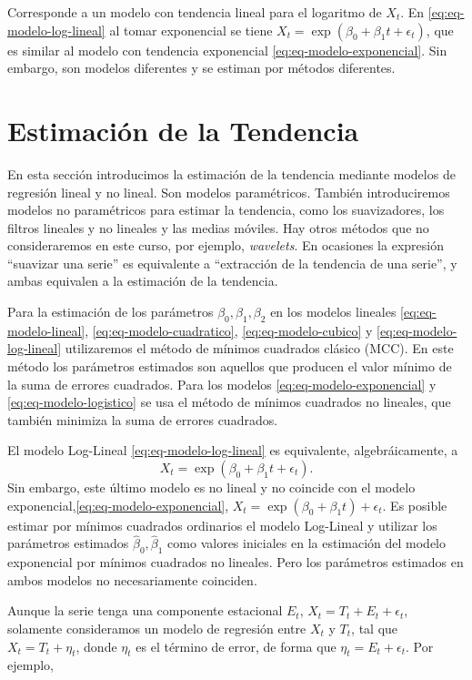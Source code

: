 \documentclass[12pt,]{krantz}
\theoremstyle{definition}
\theoremstyle{definition}
\theoremstyle{definition}
\theoremstyle{remark}
\begin{document}
Corresponde a un modelo con tendencia lineal para el logaritmo de
\(X_t\). En \eqref{eq:eq-modelo-log-lineal} al tomar exponencial se tiene
\(X_t = \exp(\beta_0+\beta_1t + \epsilon_t)\), que es similar al modelo
con tendencia exponencial \eqref{eq:eq-modelo-exponencial}. Sin embargo,
son modelos diferentes y se estiman por métodos diferentes.

\section{Estimación de la Tendencia}\label{estimacion-de-la-tendencia}

En esta sección introducimos la estimación de la tendencia mediante
modelos de regresión lineal y no lineal. Son modelos paramétricos.
También introduciremos modelos no paramétricos para estimar la
tendencia, como los suavizadores, los filtros lineales y no lineales y
las medias móviles. Hay otros métodos que no consideraremos en este
curso, por ejemplo, \emph{wavelets}. En ocasiones la expresión
``suavizar una serie'' es equivalente a ``extracción de la tendencia de
una serie'', y ambas equivalen a la estimación de la tendencia.

Para la estimación de los parámetros \(\beta_0,\beta_1,\beta_2\) en los
modelos lineales \eqref{eq:eq-modelo-lineal},
\eqref{eq:eq-modelo-cuadratico}, \eqref{eq:eq-modelo-cubico} y
\eqref{eq:eq-modelo-log-lineal} utilizaremos el método de mínimos
cuadrados clásico (MCC). En este método los parámetros estimados son
aquellos que producen el valor mínimo de la suma de errores cuadrados.
Para los modelos \eqref{eq:eq-modelo-exponencial} y
\eqref{eq:eq-modelo-logistico} se usa el método de mínimos cuadrados no
lineales, que también minimiza la suma de errores cuadrados.

El modelo Log-Lineal \eqref{eq:eq-modelo-log-lineal} es equivalente,
algebráicamente, a \[X_t = \exp(\beta_0 + \beta_1t + \epsilon_t).\] Sin
embargo, este último modelo es no lineal y no coincide con el modelo
exponencial,\eqref{eq:eq-modelo-exponencial},
\(X_t = \exp(\beta_0+\beta_1t)+\epsilon_t\). Es posible estimar por
mínimos cuadrados ordinarios el modelo Log-Lineal y utilizar los
parámetros estimados \(\hat{\beta}_0,\hat{\beta}_1\) como valores
iniciales en la estimación del modelo exponencial por mínimos cuadrados
no lineales. Pero los parámetros estimados en ambos modelos no
necesariamente coinciden.

Aunque la serie tenga una componente estacional \(E_t\),
\(X_t = T_t + E_t + \epsilon_t\), solamente consideramos un modelo de
regresión entre \(X_t\) y \(T_t\), tal que \(X_t = T_t + \eta_t\), donde
\(\eta_t\) es el término de error, de forma que
\(\eta_t=E_t+\epsilon_t\). Por ejemplo,
\end{document}
